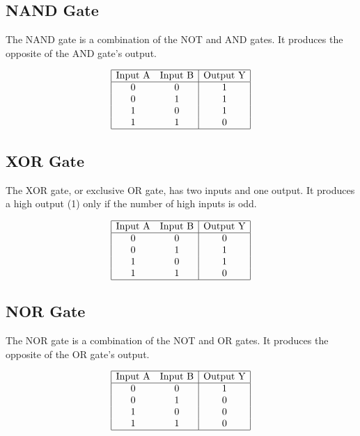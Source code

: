 \documentclass{article}
\begin{document}
\subsection*{NAND Gate}

The NAND gate is a combination of the NOT and AND gates. It produces the opposite of the AND gate's output.

\[
\begin{array}{|cc|c|}
\hline
\text{Input A} & \text{Input B} & \text{Output Y} \\
\hline
0 & 0 & 1 \\
0 & 1 & 1 \\
1 & 0 & 1 \\
1 & 1 & 0 \\
\hline
\end{array}
\]

\subsection*{XOR Gate}

The XOR gate, or exclusive OR gate, has two inputs and one output. It produces a high output (1) only if the number of high inputs is odd.

\[
\begin{array}{|cc|c|}
\hline
\text{Input A} & \text{Input B} & \text{Output Y} \\
\hline
0 & 0 & 0 \\
0 & 1 & 1 \\
1 & 0 & 1 \\
1 & 1 & 0 \\
\hline
\end{array}
\]

\subsection*{NOR Gate}

The NOR gate is a combination of the NOT and OR gates. It produces the opposite of the OR gate's output.

\[
\begin{array}{|cc|c|}
\hline
\text{Input A} & \text{Input B} & \text{Output Y} \\
\hline
0 & 0 & 1 \\
0 & 1 & 0 \\
1 & 0 & 0 \\
1 & 1 & 0 \\
\hline
\end{array}
\]
\end{document}
